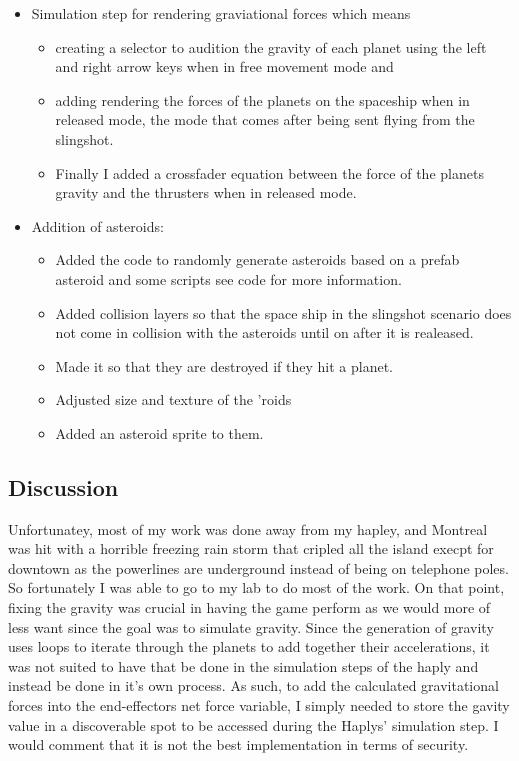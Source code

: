 \begin{itemize}
\tightlist
\item
  Simulation step for rendering graviational forces which means

  \begin{itemize}
  \tightlist
  \item
    creating a selector to audition the gravity of each planet using the
    left and right arrow keys when in free movement mode and
  \item
    adding rendering the forces of the planets on the spaceship when in
    released mode, the mode that comes after being sent flying from the
    slingshot.
  \item
    Finally I added a crossfader equation between the force of the
    planets gravity and the thrusters when in released mode.
  \end{itemize}
\item
  Addition of asteroids:

  \begin{itemize}
  \tightlist
  \item
    Added the code to randomly generate asteroids based on a prefab
    asteroid and some scripts see code for more information.
  \item
    Added collision layers so that the space ship in the slingshot
    scenario does not come in collision with the asteroids until on
    after it is realeased.
  \item
    Made it so that they are destroyed if they hit a planet.
  \item
    Adjusted size and texture of the 'roids
  \item
    Added an asteroid sprite to them.
  \end{itemize}
\end{itemize}

\hypertarget{discussion}{%
\subsection{Discussion}\label{discussion}}

Unfortunatey, most of my work was done away from my hapley, and Montreal
was hit with a horrible freezing rain storm that cripled all the island
execpt for downtown as the powerlines are underground instead of being
on telephone poles. So fortunately I was able to go to my lab to do most
of the work. On that point, fixing the gravity was crucial in having the
game perform as we would more of less want since the goal was to
simulate gravity. Since the generation of gravity uses loops to iterate
through the planets to add together their accelerations, it was not
suited to have that be done in the simulation steps of the haply and
instead be done in it's own process. As such, to add the calculated
gravitational forces into the end-effectors net force variable, I simply
needed to store the gavity value in a discoverable spot to be accessed
during the Haplys' simulation step. I would comment that it is not the
best implementation in terms of security.

